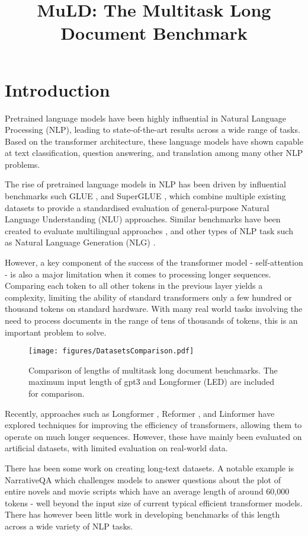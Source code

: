 \documentclass[10pt, a4paper]{article}
\title{MuLD: The Multitask Long Document Benchmark}
\begin{document}
\maketitleabstract

\section{Introduction}

Pretrained language models have been highly influential in Natural Language Processing (NLP), leading to state-of-the-art results across a wide range of tasks. Based on the transformer architecture, these language models have shown capable at text classification, question answering, and translation among many other NLP problems.

The rise of pretrained language models in NLP has been driven by influential benchmarks such GLUE \cite{Wang_2018}, and SuperGLUE \cite{Wang_2019}, which combine multiple existing datasets to provide a standardised evaluation of general-purpose Natural Language Understanding (NLU) approaches. Similar benchmarks have been created to evaluate multilingual approaches \cite{Yao_2021}, and other types of NLP task such as Natural Language Generation (NLG) \cite{Liu_2021}.

However, a key component of the success of the transformer model - self-attention - is also a major limitation when it comes to processing longer sequences. Comparing each token to all other tokens in the previous layer yields a  complexity, limiting the ability of standard transformers only a few hundred or thousand tokens on standard hardware. With many real world tasks involving the need to process documents in the range of tens of thousands of tokens, this is an important problem to solve.

\begin{figure}[t]
    \centering
    \texttt{[image: figures/DatasetsComparison.pdf]}
    \caption{\centering Comparison of lengths of multitask long document benchmarks. The maximum input length of gpt3 and Longformer (LED) are included for comparison.}
    \label{fig:benchmark_comparison}
\end{figure}
Recently, approaches such as Longformer \cite{Beltagy_2020}, Reformer \cite{Kitaev_2020}, and Linformer \cite{Wang_2020} have explored techniques for improving the efficiency of transformers, allowing them to operate on much longer sequences. However, these have mainly been evaluated on artificial datasets, with limited evaluation on real-world data.

There has been some work on creating long-text datasets. A notable example is NarrativeQA \cite{Kocisky_2018} which challenges models to answer questions about the plot of entire novels and movie scripts which have an average length of around 60,000 tokens - well beyond the input size of current typical efficient transformer models. There has however been little work in developing benchmarks of this length across a wide variety of NLP tasks.
\end{document}
